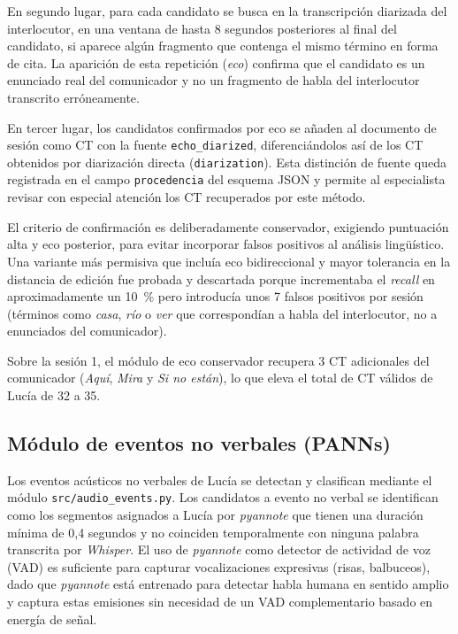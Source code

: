 En segundo lugar, para cada candidato se busca en la transcripción diarizada del
interlocutor, en una ventana de hasta 8 segundos posteriores al final del candidato,
si aparece algún fragmento que contenga el mismo término en forma de cita. La aparición
de esta repetición (\emph{eco}) confirma que el candidato es un enunciado real del
comunicador y no un fragmento de habla del interlocutor transcrito erróneamente.

En tercer lugar, los candidatos confirmados por eco se añaden al documento de sesión
como \ac{CT} con la fuente \texttt{echo\_diarized}, diferenciándolos así de los
\ac{CT} obtenidos por diarización directa (\texttt{diarization}). Esta distinción de
fuente queda registrada en el campo \texttt{procedencia} del esquema \ac{JSON} y
permite al especialista revisar con especial atención los \ac{CT} recuperados por este
método.

El criterio de confirmación es deliberadamente conservador, exigiendo puntuación alta
y eco posterior, para evitar incorporar falsos positivos al análisis lingüístico. Una
variante más permisiva que incluía eco bidireccional y mayor tolerancia en la distancia
de edición fue probada y descartada porque incrementaba el \emph{recall} en
aproximadamente un 10~\% pero introducía unos 7 falsos positivos por sesión (términos
como \emph{casa}, \emph{río} o \emph{ver} que correspondían a habla del interlocutor,
no a enunciados del comunicador).

Sobre la sesión 1, el módulo de eco conservador recupera 3 \ac{CT} adicionales del
comunicador (\emph{Aquí}, \emph{Mira} y \emph{Si no están}), lo que eleva el total de
\ac{CT} válidos de Lucía de 32 a 35.


\subsection{Módulo de eventos no verbales (PANNs)}
\label{subsec:rec_panns}

Los eventos acústicos no verbales de Lucía se detectan y clasifican mediante el módulo
\texttt{src/audio\_events.py}. Los candidatos a evento no verbal se identifican como
los segmentos asignados a Lucía por \emph{pyannote} que tienen una duración mínima de
0{,}4 segundos y no coinciden temporalmente con ninguna palabra transcrita por
\emph{Whisper}. El uso de \emph{pyannote} como detector de actividad de voz (\ac{VAD})
es suficiente para capturar vocalizaciones expresivas (risas, balbuceos), dado que
\emph{pyannote} está entrenado para detectar habla humana en sentido amplio y captura
estas emisiones sin necesidad de un \ac{VAD} complementario basado en energía de señal.


